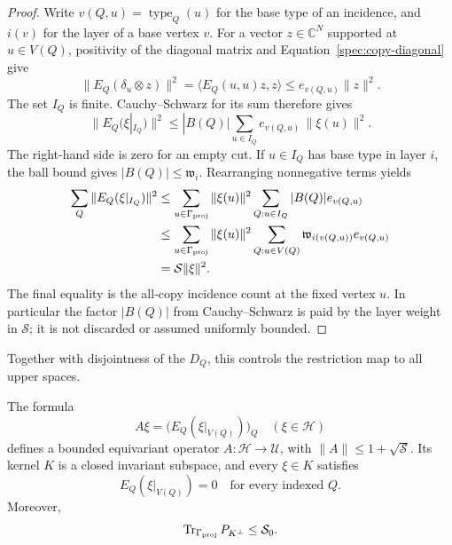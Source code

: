 \begin{proof}
Write $v(Q,u)=\operatorname{type}_Q(u)$ for the base type of an incidence,
and $i(v)$ for the layer of a base vertex $v$. For a vector
$z\in\mathbb C^N$ supported at $u\in V(Q)$, positivity of the diagonal
matrix and Equation~\eqref{spec:copy-diagonal} give
\[
 \|E_Q(\delta_u\otimes z)\|^2
       =\langle E_Q(u,u)z,z\rangle
       \leq e_{v(Q,u)}\|z\|^2.
\]
The set $I_Q$ is finite. Cauchy--Schwarz for its sum therefore gives
\begin{equation}
 \|E_Q(\xi|_{I_Q})\|^2
       \leq |B(Q)|\sum_{u\in I_Q}
                  e_{v(Q,u)}\,\|\xi(u)\|^2.
 \label{spec:finite-cut-CS}
\end{equation}
The right-hand side is zero for an empty cut. If $u\in I_Q$ has base
type in layer $i$, the ball bound gives $|B(Q)|\leq\mathfrak w_i$.
Rearranging nonnegative terms yields
\begin{align*}
 \sum_Q\|E_Q(\xi|_{I_Q})\|^2
 &\leq\sum_{u\in\Gamma_{\mathrm{proj}}}\|\xi(u)\|^2
       \sum_{Q:u\in I_Q}|B(Q)|e_{v(Q,u)}\\
 &\leq\sum_{u\in\Gamma_{\mathrm{proj}}}\|\xi(u)\|^2
       \sum_{Q:u\in V(Q)}\mathfrak w_{i(v(Q,u))}e_{v(Q,u)}\\
 &=\mathcal S\|\xi\|^2.
\end{align*}
The final equality is the all-copy incidence count at the fixed vertex
$u$. In particular the factor $|B(Q)|$ from Cauchy--Schwarz is paid by
the layer weight in $\mathcal S$; it is not discarded or assumed
uniformly bounded.
\end{proof}

Together with disjointness of the $D_Q$, this controls the restriction
map to all upper spaces.

\begin{lemma}
\label{spec:restriction}
The formula
\begin{equation}
    A\xi=\big(E_Q(\xi|_{V(Q)})\big)_Q
       \quad(\xi\in\mathcal H)
 \label{spec:analysis-operator}
\end{equation}
defines a bounded equivariant operator $A:\mathcal H\to\mathcal U$,
with $\|A\|\leq1+\sqrt{\mathcal S}$. Its kernel $K$ is a closed
invariant subspace, and every $\xi\in K$ satisfies
\begin{equation}
        E_Q(\xi|_{V(Q)})=0\quad\text{for every indexed }Q.
 \label{spec:kernel-restrictions}
\end{equation}
Moreover,
\begin{equation}
           \operatorname{Tr}_{\Gamma_{\mathrm{proj}}} P_{K^\perp}\leq\mathcal S_0.
 \label{spec:kernel-complement-size}
\end{equation}
\end{lemma}

